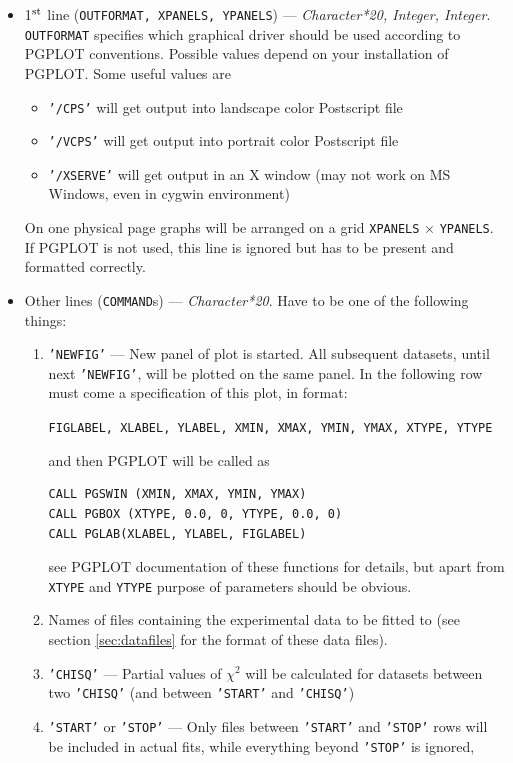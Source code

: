 \documentclass[12pt]{article}
\begin{document}
\begin{itemize}

\item 
1$^{\rm st}$ line (\texttt{OUTFORMAT, XPANELS, YPANELS}) ---  \emph{Character*20, Integer, Integer}.
\texttt{OUTFORMAT} specifies which graphical driver should be used according to PGPLOT conventions.
Possible values depend on your installation of PGPLOT. Some useful values are
  \begin{itemize}
  \item \texttt{'/CPS'}  will get output into landscape color Postscript file 
  \item \texttt{'/VCPS'}  will get output into portrait color Postscript file 
  \item \texttt{'/XSERVE'} will get output in an X window (may not work on MS Windows, even
   in cygwin environment)
  \end{itemize}
On one physical page graphs will be arranged on a grid \texttt{XPANELS} 
$\times$ \texttt{YPANELS}.
If PGPLOT is not used, this line is ignored but has to be present and formatted correctly.

\item
Other lines (\texttt{COMMAND}s) --- \emph{Character*20}. Have to be one
of the following things:
\begin{enumerate}
\item 
\texttt{'NEWFIG'} --- New panel of plot is started. All subsequent
datasets, until next \texttt{'NEWFIG'}, will be plotted on the same panel.
In the following row must come a specification of this plot,
in format:
\begin{center}
 \texttt{FIGLABEL, XLABEL, YLABEL, XMIN, XMAX, YMIN, YMAX, XTYPE, YTYPE}
\end{center}
and then PGPLOT will be called as
\begin{verbatim}
CALL PGSWIN (XMIN, XMAX, YMIN, YMAX)
CALL PGBOX (XTYPE, 0.0, 0, YTYPE, 0.0, 0)
CALL PGLAB(XLABEL, YLABEL, FIGLABEL)
\end{verbatim}
see PGPLOT documentation of these functions for details, but apart from
\texttt{XTYPE} and \texttt{YTYPE} purpose of parameters should be obvious.
\item
 Names of files containing the experimental data to be fitted to (see
section \ref{sec:datafiles} for the format of these data files).
\item 
\texttt{'CHISQ'} --- Partial values of $\chi^2$ will be calculated for
  datasets between two \texttt{'CHISQ'} (and between \texttt{'START'} 
and \texttt{'CHISQ'})
\item
\texttt{'START'} or \texttt{'STOP'} --- Only files between \texttt{'START'}
and \texttt{'STOP'} rows will be included in actual fits, while everything beyond
\texttt{'STOP'} is ignored,
\end{enumerate}

\end{itemize}
\end{document}
